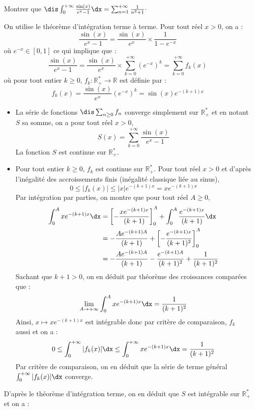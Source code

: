 \documentclass[a4paper,10pt]{report}
\begin{document}
\begin{Exercice}{} Montrer que $\dis \int_{0}^{+ \infty} \frac{\sin(x)}{e^x-1} \dx = \sum_{n=1}^{+ \infty} \frac{1}{n^2+1}\cdot$
\end{Exercice}

\corr On utilise le théorème d'intégration terme à terme. Pour tout réel $x>0$, on a :
$$ \frac{\sin(x)}{e^x-1}  = \dfrac{\sin(x)}{e^x} \times \dfrac{1}{1-e^{-x}}$$
où $e^{-x} \in [0,1]$ ce qui implique que :
$$ \frac{\sin(x)}{e^x-1}  = \dfrac{\sin(x)}{e^x} \times \sum_{k=0}^{+ \infty} (e^{-x})^k  = \sum_{k=0}^{+ \infty} f_k(x)$$
où pour tout entier $k \geq 0$, $f_k : \mathbb{R}_+^* \rightarrow \mathbb{R}$ est définie par :
$$ f_k(x) = \dfrac{\sin(x)}{e^x} (e^{-x})^k = \sin(x) e^{-(k+1)x}$$

\begin{itemize}
\item La série de fonctions $\dis \sum_{n \geq 0} f_n$ converge simplement sur $\mathbb{R}_+^*$ et en notant $S$ sa somme, on a pour tout réel $x>0$,
$$ S(x)= \sum_{k=0}^{+ \infty} \dfrac{\sin(x)}{e^x-1}$$
La fonction $S$ est continue sur $\mathbb{R}_+^*$.
\item Pour tout entier $k \geq 0$, $f_k$ est continue sur $\mathbb{R}_+^*$. Pour tout réel $x>0$ et d'après l'inégalité des accroissements finis (inégalité classique liée au sinus),
$$ 0 \leq \vert f_k(x) \vert \leq \vert x \vert e^{-(k+1)x} = x  e^{-(k+1)x}$$
Par intégration par parties, on montre que pour tout réel $A \geq 0$,
\begin{align*}
\int_0^{A} x e^{-(k+1)x} \dx & = \left[- \dfrac{xe^{-(k+1)x}}{(k+1)} \right]_0^A + \int_0^A \dfrac{e^{-(k+1)x}}{(k+1)} \dx \\
& = - \dfrac{Ae^{-(k+1)A}}{(k+1)} +  \left[- \dfrac{e^{-(k+1)x}}{(k+1)^2} \right]_0^A \\
& =  - \dfrac{Ae^{-(k+1)A}}{(k+1)} - \dfrac{e^{-(k+1)A}}{(k+1)^2} + \dfrac{1}{(k+1)^2}
\end{align*}
Sachant que $k+1>0$, on en déduit par théorème des croissances comparées que :
$$ \lim_{A \rightarrow + \infty} \int_0^{A} x e^{-(k+1)x} \dx = \dfrac{1}{(k+1)^2}$$
Ainsi, $x \mapsto x  e^{-(k+1)x}$ est intégrable donc par critère de comparaison, $f_k$ aussi et on a :
$$ 0 \leq \int_0^{+ \infty}\vert f_k(x) \vert \dx \leq  \int_0^{+ \infty} x  e^{-(k+1)x} \dx = \dfrac{1}{(k+1)^2}$$
Par critère de comparaison, on en déduit que la série de terme général $\int_0^{+ \infty}\vert f_k(x) \vert \dx$ converge.
\end{itemize}
D'après le théorème d'intégration terme, on en déduit que $S$ est intégrable sur $\mathbb{R}_+^*$ et on a :
\end{document}
